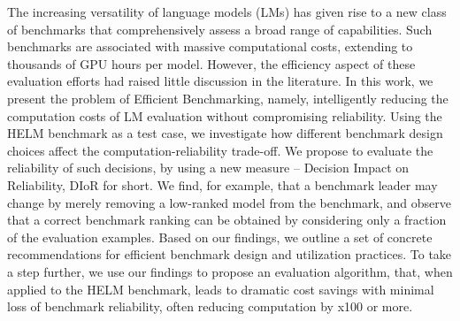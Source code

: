 The increasing versatility of language models (LMs) has given rise to a new class of benchmarks that comprehensively assess a broad range of capabilities.  Such benchmarks are associated with massive computational costs, extending to thousands of GPU hours per model. However, the efficiency aspect of these evaluation efforts had raised little discussion in the literature. In this work, we present the problem of Efficient Benchmarking, namely, intelligently reducing the computation costs of LM evaluation without compromising reliability.  Using the HELM benchmark as a test case, we investigate how different benchmark design choices affect the computation-reliability trade-off.  We propose to evaluate the reliability of such decisions, by using a new measure -- Decision Impact on Reliability,  DIoR for short. We find, for example, that a benchmark leader may change by merely removing a low-ranked model from the benchmark, and observe that a correct benchmark ranking can be obtained by considering only a fraction of the evaluation examples. Based on our findings, we outline a set of concrete recommendations for efficient benchmark design and utilization practices. To take a step further, we use our findings to propose an evaluation algorithm, that, when applied to the HELM benchmark, leads to dramatic cost savings with minimal loss of benchmark reliability, often reducing computation by x100 or more.